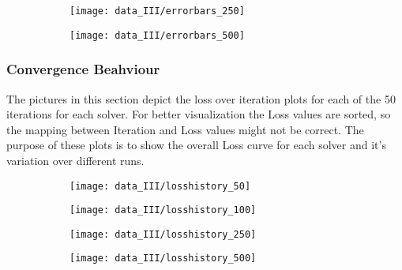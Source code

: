 \begin{figure}[h]
	\begin{subfigure}{0.5\textwidth}
		\texttt{[image: data\_III/errorbars\_250]}
		\label{fig:errorbars_250_III}
	\end{subfigure}
	\begin{subfigure}{0.5\textwidth}
		\texttt{[image: data\_III/errorbars\_500]}
		\label{fig:errorbars_500_III}
	\end{subfigure}
\end{figure}


\newpage


\subsubsection{Convergence Beahviour}

The pictures in this section depict the loss over iteration plots for each of the 50 iterations for each solver. For better visualization the Loss values are sorted, so the mapping between Iteration and Loss values might not be correct. The purpose of these plots is to show the overall Loss curve for each solver and it's variation over different runs.  

\begin{figure}[h]
	\begin{subfigure}{0.5\textwidth}
		\texttt{[image: data\_III/losshistory\_50]}
		\label{fig:losshistory_50_III}
	\end{subfigure}
	\begin{subfigure}{0.5\textwidth}
		\texttt{[image: data\_III/losshistory\_100]}
		\label{fig:losshistory_100_III}
	\end{subfigure}
\end{figure}

\begin{figure}[h]
	\begin{subfigure}{0.5\textwidth}
		\texttt{[image: data\_III/losshistory\_250]}
		\label{fig:losshistory_250_III}
	\end{subfigure}
	\begin{subfigure}{0.5\textwidth}
		\texttt{[image: data\_III/losshistory\_500]}
		\label{fig:losshistory_500_III}
	\end{subfigure}
\end{figure}